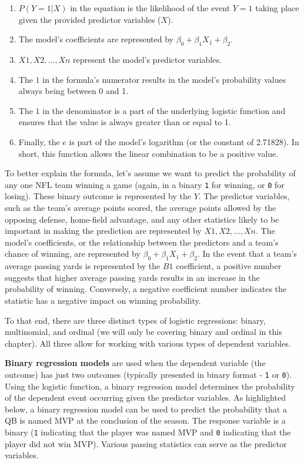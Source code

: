 \documentclass[
  letterpaper,
]{krantz}
\providecommand{\tightlist}{%
  \setlength{\itemsep}{0pt}\setlength{\parskip}{0pt}}\usepackage{longtable,booktabs,array}
\begin{document}
\begin{enumerate}
\def\labelenumi{\arabic{enumi}.}
\tightlist
\item
  \(P(Y=1|X)\) in the equation is the likelihood of the event \(Y=1\)
  taking place given the provided predictor variables (\(X\)).
\item
  The model's coefficients are represented by
  \(\beta_0 + \beta_1X_1 + \beta_2\).
\item
  \(X1, X2, ..., Xn\) represent the model's predictor variables.
\item
  The \(1\) in the formula's numerator results in the model's
  probability values always being between 0 and 1.
\item
  The \(1\) in the denominator is a part of the underlying logistic
  function and ensures that the value is always greater than or equal to
  1.
\item
  Finally, the \(e\) is part of the model's logarithm (or the constant
  of 2.71828). In short, this function allows the linear combination to
  be a positive value.
\end{enumerate}

To better explain the formula, let's assume we want to predict the
probability of any one NFL team winning a game (again, in a binary
\texttt{1} for winning, or \texttt{0} for losing). These binary outcome
is represented by the \(Y\). The predictor variables, such as the team's
average points scored, the average points allowed by the opposing
defense, home-field advantage, and any other statistics likely to be
important in making the prediction are represented by
\(X1, X2, ..., Xn\). The model's coefficients, or the relationship
between the predictors and a team's chance of winning, are represented
by \(\beta_0 + \beta_1X_1 + \beta_2\). In the event that a team's
average passing yards is represented by the \(B1\) coefficient, a
positive number suggests that higher average passing yards results in an
increase in the probability of winning. Conversely, a negative
coefficient number indicates the statistic has a negative impact on
winning probability.

To that end, there are three distinct types of logistic regressions:
binary, multinomial, and ordinal (we will only be covering binary and
ordinal in this chapter). All three allow for working with various types
of dependent variables.

\textbf{Binary regression models} are used when the dependent variable
(the outcome) has just two outcomes (typically presented in binary
format - \texttt{1} or \texttt{0}). Using the logistic function, a
binary regression model determines the probability of the dependent
event occurring given the predictor variables. As highlighted below, a
binary regression model can be used to predict the probability that a QB
is named MVP at the conclusion of the season. The response variable is a
binary (\texttt{1} indicating that the player was named MVP and
\texttt{0} indicating that the player did not win MVP). Various passing
statistics can serve as the predictor variables.
\end{document}
